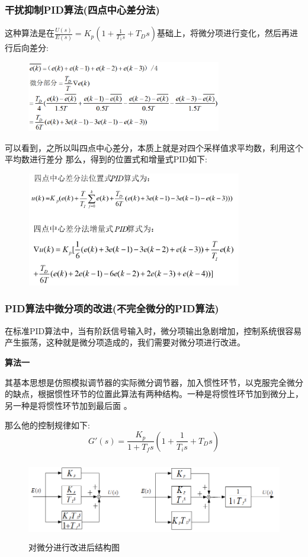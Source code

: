 \documentclass[12pt, a4paper, oneside]{ctexbook}
\begin{document}
\subsubsection{干扰抑制PID算法(四点中心差分法)} 
这种算法是在$\frac{U(s)}{E(s)}=K_p(1+\frac{1}{T_1s}+T_Ds)$基础上，将微分项进行变化，然后再进行后向差分:
\begin{figure}[htbp]
	\centering
	\includegraphics[width=8.48cm,height=3.08cm]{img/5_6.png}
\end{figure}
可以看到，之所以叫四点中心差分，本质上就是对四个采样值求平均数，利用这个平均数进行差分
那么，得到的位置式和增量式PID如下:
\begin{figure}[htbp]
	\centering
	\includegraphics[width=9.4cm,height=5cm]{img/5_7.png}
\end{figure}
\subsubsection{PID算法中微分项的改进(不完全微分的PID算法)} 
在标准PID算法中，当有阶跃信号输入时，微分项输出急剧增加，控制系统很容易产生振荡，这种就是微分项造成的，我们需要对微分项进行改进。

\textbf{算法一}

其基本思想是仿照模拟调节器的实际微分调节器，加入惯性环节，以克服完全微分的缺点，根据惯性环节的位置此算法有两种结构。一种是将惯性环节加到微分上，另一种是将惯性环节加到最后面 。

那么他的控制规律如下:
$$
G'(s)=\frac{K_p}{1+T_fs}(1+\frac{1}{T_is}+T_Ds)
$$
\begin{figure}[htbp]
	\centering
	\includegraphics[width=12cm,height=3.5cm]{img/5_8.png}
	\caption{对微分进行改进后结构图}
\end{figure}
\end{document}
